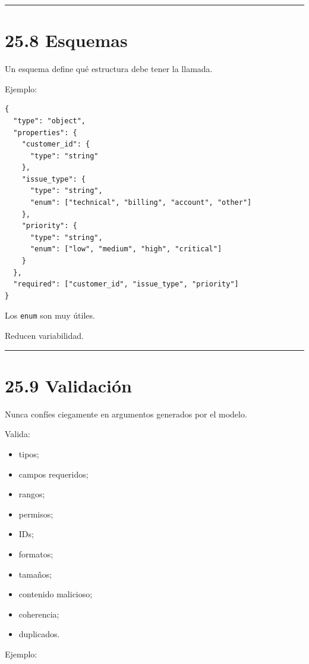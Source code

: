 \begin{center}\rule{0.5\linewidth}{0.5pt}\end{center}

\section{25.8 Esquemas}\label{esquemas}

Un esquema define qué estructura debe tener la llamada.

Ejemplo:

\begin{lstlisting}
{
  "type": "object",
  "properties": {
    "customer_id": {
      "type": "string"
    },
    "issue_type": {
      "type": "string",
      "enum": ["technical", "billing", "account", "other"]
    },
    "priority": {
      "type": "string",
      "enum": ["low", "medium", "high", "critical"]
    }
  },
  "required": ["customer_id", "issue_type", "priority"]
}
\end{lstlisting}

Los \passthrough{\lstinline!enum!} son muy útiles.

Reducen variabilidad.

\begin{center}\rule{0.5\linewidth}{0.5pt}\end{center}

\section{25.9 Validación}\label{validaciuxf3n}

Nunca confíes ciegamente en argumentos generados por el modelo.

Valida:

\begin{itemize}
\tightlist
\item
  tipos;
\item
  campos requeridos;
\item
  rangos;
\item
  permisos;
\item
  IDs;
\item
  formatos;
\item
  tamaños;
\item
  contenido malicioso;
\item
  coherencia;
\item
  duplicados.
\end{itemize}

Ejemplo:

